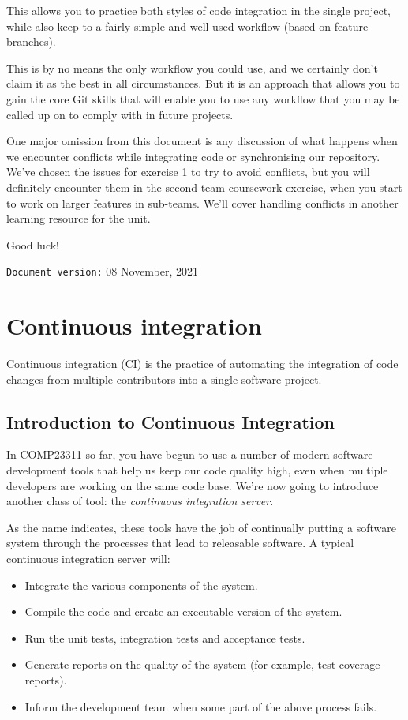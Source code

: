 \documentclass[
]{book}
\providecommand{\tightlist}{%
  \setlength{\itemsep}{0pt}\setlength{\parskip}{0pt}}
\begin{document}
This allows you to practice both styles of code integration in the single project, while also keep to a fairly simple and well-used workflow (based on feature branches).

This is by no means the only workflow you could use, and we certainly don't claim it as the best in all circumstances. But it is an approach that allows you to gain the core Git skills that will enable you to use any workflow that you may be called up on to comply with in future projects.

One major omission from this document is any discussion of what happens when we encounter conflicts while integrating code or synchronising our repository. We've chosen the issues for exercise 1 to try to avoid conflicts, but you will definitely encounter them in the second team coursework exercise, when you start to work on larger features in sub-teams. We'll cover handling conflicts in another learning resource for the unit.

Good luck!

\texttt{Document\ version:} 08 November, 2021

\hypertarget{integrating}{%
\chapter{Continuous integration}\label{integrating}}

Continuous integration (CI) is the practice of automating the integration of code changes from multiple contributors into a single software project.

\hypertarget{ici}{%
\section{Introduction to Continuous Integration}\label{ici}}

In COMP23311 so far, you have begun to use a number of modern software development tools that help us keep our code quality high, even when multiple developers are working on the same code base. We're now going to introduce another class of tool: the \emph{continuous integration server}.

As the name indicates, these tools have the job of continually putting a software system through the processes that lead to releasable software. A typical continuous integration server will:

\begin{itemize}
\tightlist
\item
  Integrate the various components of the system.
\item
  Compile the code and create an executable version of the system.
\item
  Run the unit tests, integration tests and acceptance tests.
\item
  Generate reports on the quality of the system (for example, test coverage reports).
\item
  Inform the development team when some part of the above process fails.
\end{itemize}
\end{document}
